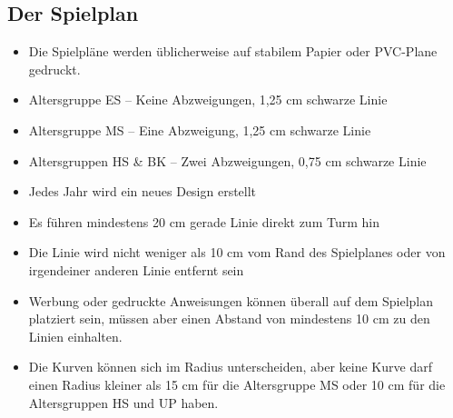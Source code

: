 \documentclass[a4paper,12pt]{article}
\begin{document}
\subsection{Der Spielplan}
\begin{itemize}
	\item Die Spielpläne werden üblicherweise auf stabilem Papier oder PVC-Plane gedruckt.
	\item Altersgruppe ES – Keine Abzweigungen, 1,25 cm schwarze Linie
	\item Altersgruppe MS – Eine Abzweigung, 1,25 cm schwarze Linie
	\item Altersgruppen HS \& BK – Zwei Abzweigungen, 0,75 cm schwarze Linie
	\item Jedes Jahr wird ein neues Design erstellt
	\item Es führen mindestens 20 cm gerade Linie direkt zum Turm hin
	\item Die Linie wird nicht weniger als 10 cm vom Rand des Spielplanes
		oder von irgendeiner anderen Linie entfernt sein
	\item Werbung oder gedruckte Anweisungen können überall auf dem
		Spielplan platziert sein, müssen aber einen Abstand von
		mindestens 10 cm zu den Linien einhalten.
	\item Die Kurven können sich im Radius unterscheiden, aber keine Kurve
		darf einen Radius kleiner als 15 cm für die Altersgruppe MS oder 10 cm für die
		Altersgruppen HS und UP haben.
\end{itemize}
\end{document}

